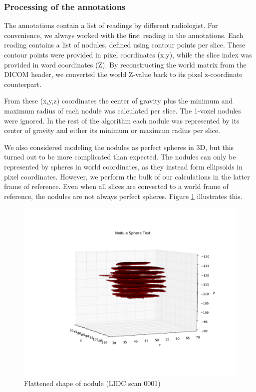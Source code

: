 \subsubsection{Processing of the annotations}

The annotations contain a list of readings by different radiologist. For
convenience, we always worked with the first reading in the annotations. Each
reading contains a list of nodules, defined using contour points per slice.
These contour points were provided in pixel coordinates (x,y), while the slice
index was provided in word coordinates (Z). By reconstructing the world matrix
from the DICOM header, we converted the world Z-value back to its pixel
z-coordinate counterpart.

From these (x,y,z) coordinates the center of gravity plus the minimum and
maximum radius of each nodule was calculated per slice. The 1-voxel nodules were
ignored. In the rest of the algorithm each nodule was represented by its center
of gravity and either its minimum or maximum radius per slice.

We also considered modeling the nodules as perfect spheres in 3D, but this
turned out to be more complicated than expected. The nodules can only be
represented by spheres in world coordinates, as they instead form ellipsoids in
pixel coordinates. However, we perform the bulk of our calculations in the
latter frame of reference. Even when all slices are converted to a world frame
of reference, the nodules are not always perfect spheres. Figure
\ref{fig:flatNodule} illustrates this.

\begin{figure}[ht]
 \begin{center}
    \includegraphics[width=\linewidth, trim=150 0 0 0]{img/NoduleSphereTest_0001.pdf}
    \caption{Flattened shape of nodule (LIDC scan 0001)}
    \label{fig:flatNodule}
 \end{center}
\end{figure}

